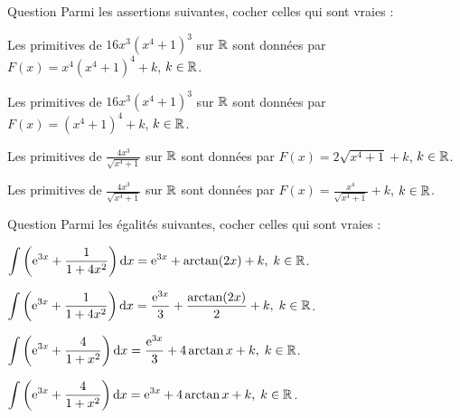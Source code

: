 \begin{multi}[multiple,feedback=
{Avec \(u=x^4+1\), on a : \(\mathrm{d}u=4x^3\, \mathrm{d}x\). D'où
\[\int 16x^3(x^4+1)^3\mathrm{d}x=\int 4u^3\, \mathrm{d}u=u^4+k=(x^4+1)^4+k,\; k\in \Rr,\]
et
\[\int \frac{4x^3\, \mathrm{d}x}{\sqrt{x^4+1}}=\int \frac{\mathrm{d}u}{\sqrt{u}}=2\sqrt{u}+k=2\sqrt{x^4+1}+k,\; k\in \Rr.\]
}]{Question}
Parmi les assertions suivantes, cocher celles qui sont vraies :

    \item Les primitives de \(16x^3(x^4+1)^3\) sur \(\mathbb{R}\) sont données par \(\displaystyle F(x)=x^4(x^4+1)^4+k\), \(k\in \mathbb{R}\).
    \item* Les primitives de \(16x^3(x^4+1)^3\) sur \(\mathbb{R}\) sont données par \(\displaystyle F(x)=(x^4+1)^4+k\), \(k\in \mathbb{R}\).
    \item* Les primitives de \(\displaystyle \frac{4x^3}{\sqrt{x^4+1}}\) sur \(\mathbb{R}\) sont données par \(\displaystyle F(x)=2\sqrt{x^4+1}+k\), \(k\in \mathbb{R}\).
    \item Les primitives de \(\displaystyle \frac{4x^3}{\sqrt{x^4+1}}\) sur \(\mathbb{R}\) sont données par \(\displaystyle F(x)=\frac{x^4}{\sqrt{x^4+1}}+k\), \(k\in \mathbb{R}\).
\end{multi}


\begin{multi}[multiple,feedback=
{Utiliser la linéarité en remarquant que : \(\displaystyle \int \mathrm{e}^{3x}\mathrm{d}x=\frac{\mathrm{e}^{3x}}{3}+k_1\),
\[\int \frac{\mathrm{d}x}{1+4x^2}=\frac{\arctan (2x)}{2}+k_2\quad \mbox{et}\quad \int \frac{4\, \mathrm{d}x}{1+x^2}=4\arctan x+k_3,\; k_i\in \Rr.\]
}]{Question}
Parmi les égalités suivantes, cocher celles qui sont vraies :

    \item \(\displaystyle \int \left(\mathrm{e}^{3x}+\frac{1}{1+4x^2}\right)\mathrm{d}x=\mathrm{e}^{3x}+\arctan (2x)+k,\; k\in \mathbb{R}\).
    \item* \(\displaystyle \int \left(\mathrm{e}^{3x}+\frac{1}{1+4x^2}\right)\mathrm{d}x=\frac{\mathrm{e}^{3x}}{3}+\frac{\arctan (2x)}{2}+k,\; k\in \mathbb{R}\).
    \item* \(\displaystyle \int \left(\mathrm{e}^{3x}+\frac{4}{1+x^2}\right)\mathrm{d}x=\frac{\mathrm{e}^{3x}}{3}+4\arctan x+k,\; k\in \mathbb{R}\).
    \item \(\displaystyle \int \left(\mathrm{e}^{3x}+\frac{4}{1+x^2}\right)\mathrm{d}x=\mathrm{e}^{3x}+4\arctan x+k,\; k\in \mathbb{R}\).
\end{multi}


